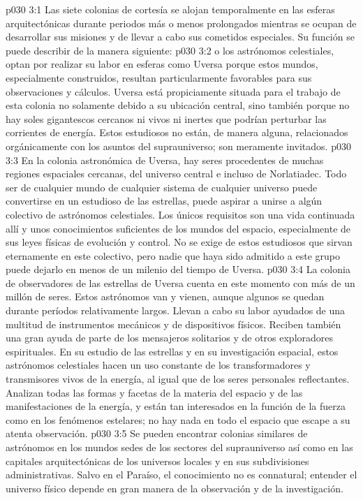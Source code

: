 \vs p030 3:1 Las siete colonias de cortesía se alojan temporalmente en las esferas arquitectónicas durante periodos más o menos prolongados mientras se ocupan de desarrollar sus misiones y de llevar a cabo sus cometidos especiales. Su función se puede describir de la manera siguiente:
\vs p030 3:2  o los astrónomos celestiales, optan por realizar su labor en esferas como Uversa porque estos mundos, especialmente construidos, resultan particularmente favorables para sus observaciones y cálculos. Uversa está propiciamente situada para el trabajo de esta colonia no solamente debido a su ubicación central, sino también porque no hay soles gigantescos cercanos ni vivos ni inertes que podrían perturbar las corrientes de energía. Estos estudiosos no están, de manera alguna, relacionados orgánicamente con los asuntos del suprauniverso; son meramente invitados.
\vs p030 3:3 En la colonia astronómica de Uversa, hay seres procedentes de muchas regiones espaciales cercanas, del universo central e incluso de Norlatiadec. Todo ser de cualquier mundo de cualquier sistema de cualquier universo puede convertirse en un estudioso de las estrellas, puede aspirar a unirse a algún colectivo de astrónomos celestiales. Los únicos requisitos son una vida continuada allí y unos conocimientos suficientes de los mundos del espacio, especialmente de sus leyes físicas de evolución y control. No se exige de estos estudiosos que sirvan eternamente en este colectivo, pero nadie que haya sido admitido a este grupo puede dejarlo en menos de un milenio del tiempo de Uversa.
\vs p030 3:4 La colonia de observadores de las estrellas de Uversa cuenta en este momento con más de un millón de seres. Estos astrónomos van y vienen, aunque algunos se quedan durante períodos relativamente largos. Llevan a cabo su labor ayudados de una multitud de instrumentos mecánicos y de dispositivos físicos. Reciben también una gran ayuda de parte de los mensajeros solitarios y de otros exploradores espirituales. En su estudio de las estrellas y en su investigación espacial, estos astrónomos celestiales hacen un uso constante de los transformadores y transmisores vivos de la energía, al igual que de los seres personales reflectantes. Analizan todas las formas y facetas de la materia del espacio y de las manifestaciones de la energía, y están tan interesados en la función de la fuerza como en los fenómenos estelares; no hay nada en todo el espacio que escape a su atenta observación.
\vs p030 3:5 Se pueden encontrar colonias similares de astrónomos en los mundos sedes de los sectores del suprauniverso así como en las capitales arquitectónicas de los universos locales y en sus subdivisiones administrativas. Salvo en el Paraíso, el conocimiento no es connatural; entender el universo físico depende en gran manera de la observación y de la investigación.
